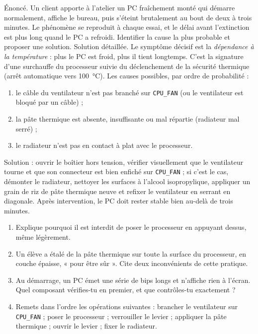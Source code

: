 \documentclass[11pt]{article}
\newcommand{\cle}[1]{{\popxbold\color{popdark}#1}}
\begin{document}
\begin{exoresolu}
Énoncé. Un client apporte à l'atelier un PC fraîchement monté qui démarre normalement, affiche le bureau, puis s'éteint brutalement au bout de deux à trois minutes. Le phénomène se reproduit à chaque essai, et le délai avant l'extinction est plus long quand le PC a refroidi. Identifier la cause la plus probable et proposer une solution.
\tcblower
Solution détaillée. Le symptôme décisif est la \emph{dépendance à la température} : plus le PC est froid, plus il tient longtemps. C'est la signature d'une \cle{surchauffe du processeur} suivie du déclenchement de la sécurité thermique (arrêt automatique vers \SI{100}{\celsius}). Les causes possibles, par ordre de probabilité :
\begin{enumerate}
  \item le câble du ventilateur n'est pas branché sur \texttt{CPU\_FAN} (ou le ventilateur est bloqué par un câble) ;
  \item la pâte thermique est absente, insuffisante ou mal répartie (radiateur mal serré) ;
  \item le radiateur n'est pas en contact à plat avec le processeur.
\end{enumerate}
Solution : ouvrir le boîtier hors tension, vérifier visuellement que le ventilateur tourne et que son connecteur est bien enfiché sur \texttt{CPU\_FAN} ; si c'est le cas, démonter le radiateur, nettoyer les surfaces à l'alcool isopropylique, appliquer un grain de riz de pâte thermique neuve et refixer le ventilateur en serrant en diagonale. Après intervention, le PC doit rester stable bien au-delà de trois minutes.
\end{exoresolu}

\begin{exercice}
\begin{enumerate}
  \item Explique pourquoi il est interdit de poser le processeur en appuyant dessus, même légèrement.
  \item Un élève a étalé de la pâte thermique sur toute la surface du processeur, en couche épaisse, « pour être sûr ». Cite deux inconvénients de cette pratique.
  \item Au démarrage, un PC émet une série de bips longs et n'affiche rien à l'écran. Quel composant vérifies-tu en premier, et que contrôles-tu exactement ?
  \item Remets dans l'ordre les opérations suivantes : brancher le ventilateur sur \texttt{CPU\_FAN} ; poser le processeur ; verrouiller le levier ; appliquer la pâte thermique ; ouvrir le levier ; fixer le radiateur.
\end{enumerate}
\end{exercice}
\end{document}

